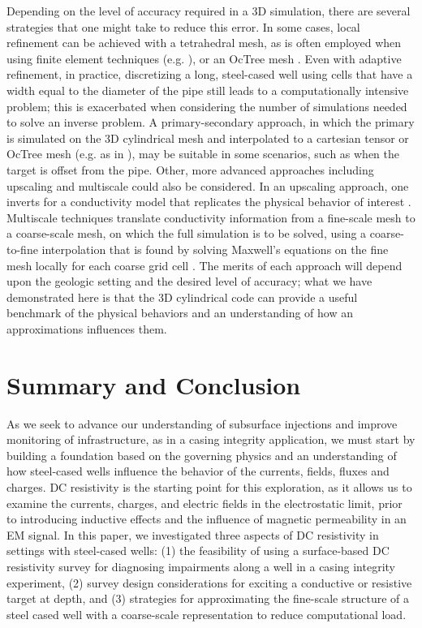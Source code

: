 

Depending on the level of accuracy required in a 3D simulation, there are several strategies that one might take to reduce this error. In some cases, local refinement can be achieved with a tetrahedral mesh, as is often employed when using finite element techniques (e.g. \cite{Weiss2016}), or an OcTree mesh \cite{Haber2007}. Even with adaptive refinement, in practice, discretizing a long, steel-cased well using cells that have a width equal to the diameter of the pipe still leads to a computationally intensive problem; this is exacerbated when considering the number of simulations needed to solve an inverse problem. A primary-secondary approach, in which the primary is simulated on the 3D cylindrical mesh and interpolated to a cartesian tensor or OcTree mesh (e.g. as in \cite{Heagy2017}), may be suitable in some scenarios, such as when the target is offset from the pipe. Other, more advanced approaches including upscaling and multiscale could also be considered. In an upscaling approach, one inverts for a conductivity model that replicates the physical behavior of interest \citep{Caudillo-Mata2017}. Multiscale techniques translate conductivity information from a fine-scale mesh to a coarse-scale mesh, on which the full simulation is to be solved, using a coarse-to-fine interpolation that is found by solving Maxwell’s equations on the fine mesh locally for each coarse grid cell \citep{Haber2014, Caudillo-Mata2017a}. The merits of each approach will depend upon the geologic setting and the desired level of accuracy; what we have demonstrated here is that the 3D cylindrical code can provide a useful benchmark of the physical behaviors and an understanding of how an approximations influences them.
\section{Summary and Conclusion}
As we seek to advance our understanding of subsurface injections and improve monitoring of infrastructure, as in a casing integrity application, we must start by building a foundation based on the governing physics and an understanding of how steel-cased wells influence the behavior of the currents, fields, fluxes and charges. DC resistivity is the starting point for this exploration, as it allows us to examine the currents, charges, and electric fields in the electrostatic limit, prior to introducing inductive effects and the influence of magnetic permeability in an EM signal. In this paper, we investigated three aspects of DC resistivity in settings with steel-cased wells: (1) the feasibility of using a surface-based DC resistivity survey for diagnosing impairments along a well in a casing integrity experiment, (2) survey design considerations for exciting a conductive or resistive target at depth, and (3) strategies for approximating the fine-scale structure of a steel cased well with a coarse-scale representation to reduce computational load.

